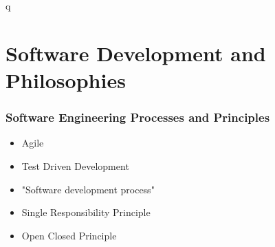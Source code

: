 q%


\part*{Software Development and Philosophies}





\toclineskip
\section{Software Engineering Processes and Principles}


\begin{itemize}
	\item Agile
	\item Test Driven Development
	\item "Software development process"
	\item Single Responsibility Principle
	\item Open Closed Principle
\end{itemize}


